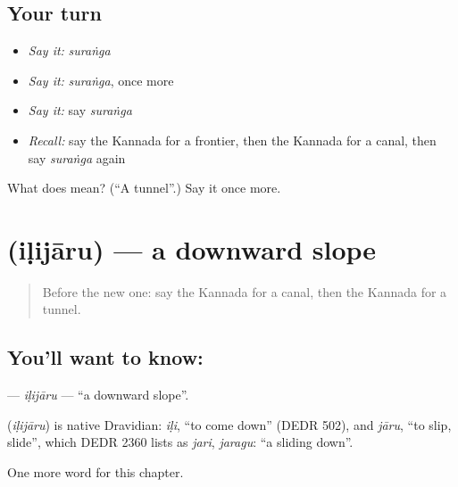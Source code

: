 \subsection*{Your turn}
\begin{itemize}
\raggedright
  \item \emph{Say it:} \emph{suraṅga}
  \item \emph{Say it:} \emph{suraṅga}, once more
  \item \emph{Say it:} say \emph{suraṅga}
  \item \emph{Recall:} say the Kannada for a frontier, then the Kannada for a canal, then say \emph{suraṅga} again
\end{itemize}

\begin{tcolorbox}[breakable,colback=teal!4,colframe=teal!35!black,title={Before you move on}]
What does  mean? (\textquotedblleft{}A tunnel\textquotedblright{}.) Say it once more.
\end{tcolorbox}
\section[\texorpdfstring{\kn{ಇಳಿಜಾರು} (iḷijāru)}{ಇಳಿಜಾರು (iḷijāru)}]{ (iḷijāru) — a downward slope}

\label{lesson:KA-C251-ilijaru}



\begin{quote}
Before the new one: say the Kannada for a canal, then the Kannada for a tunnel.
\end{quote}

\subsection*{You'll want to know: }
\textbf{} — \emph{iḷijāru} — \textquotedblleft{}a downward slope\textquotedblright{}.

\begin{cousinweb}
\textbf{} (\emph{iḷijāru}) is native Dravidian: \emph{iḷi}, \textquotedblleft{}to come down\textquotedblright{} (DEDR 502), and \emph{jāru}, \textquotedblleft{}to slip, slide\textquotedblright{}, which DEDR 2360 lists as \emph{jari}, \emph{jaragu}: \textquotedblleft{}a sliding down\textquotedblright{}.
\end{cousinweb}

\begin{grammarlens}[title={What you've built}]
One more word for this chapter.
\end{grammarlens}

